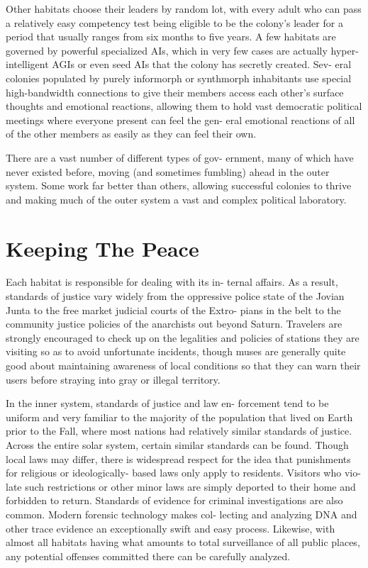 Other habitats choose their leaders by random 
lot, with every adult who can pass a relatively easy 
competency test being eligible to be the colony's 
leader for a period that usually ranges from six 
months to five years. A few habitats are governed 
by powerful specialized AIs, which in very few 
cases are actually hyper-intelligent AGIs or even 
seed AIs that the colony has secretly created. Sev-
eral colonies populated by purely informorph or 
synthmorph inhabitants use special high-bandwidth 
connections to give their members access each 
other's surface thoughts and emotional reactions, 
allowing them to hold vast democratic political 
meetings where everyone present can feel the gen-
eral emotional reactions of all of the other members 
as easily as they can feel their own.

There are a vast number of different types of gov-
ernment, many of which have never existed before, 
moving (and sometimes fumbling) ahead in the outer 
system. Some work far better than others, allowing 
successful colonies to thrive and making much of the 
outer system a vast and complex political laboratory.

\section{Keeping The Peace}

Each habitat is responsible for dealing with its in-
ternal affairs. As a result, standards of justice vary 
widely from the oppressive police state of the Jovian 
Junta to the free market judicial courts of the Extro-
pians in the belt to the community justice policies 
of the anarchists out beyond Saturn. Travelers are 
strongly encouraged to check up on the legalities and 
policies of stations they are visiting so as to avoid 
unfortunate incidents, though muses are generally 
quite good about maintaining awareness of local 
conditions so that they can warn their users before 
straying into gray or illegal territory.

In the inner system, standards of justice and law en-
forcement tend to be uniform and very familiar to the 
majority of the population that lived on Earth prior 
to the Fall, where most nations had relatively similar 
standards of justice. Across the entire solar system, 
certain similar standards can be found. Though local 
laws may differ, there is widespread respect for the 
idea that punishments for religious or ideologically-
based laws only apply to residents. Visitors who vio-
late such restrictions or other minor laws are simply 
deported to their home and forbidden to return. 
Standards of evidence for criminal investigations are 
also common. Modern forensic technology makes col-
lecting and analyzing DNA and other trace evidence 
an exceptionally swift and easy process. Likewise, 
with almost all habitats having what amounts to total 
surveillance of all public places, any potential offenses 
committed there can be carefully analyzed.

